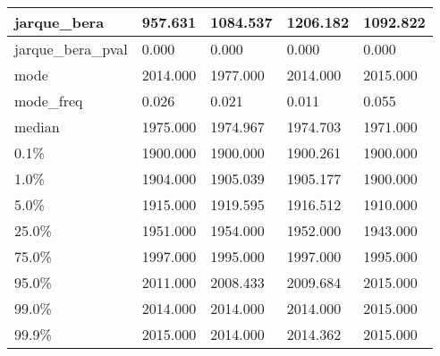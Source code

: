 \begin{table}[H]
\begin{tabular}{|l|m{10em}|m{10em}|m{10em}|m{10em}|}
\hline jarque\_bera & 957.631 & 1084.537 & 1206.182 & 1092.822 \\
\hline jarque\_bera\_pval & 0.000 & 0.000 & 0.000 & 0.000 \\
\hline mode & 2014.000 & 1977.000 & 2014.000 & 2015.000 \\
\hline mode\_freq & 0.026 & 0.021 & 0.011 & 0.055 \\
\hline median & 1975.000 & 1974.967 & 1974.703 & 1971.000 \\
\hline 0.1\% & 1900.000 & 1900.000 & 1900.261 & 1900.000 \\
\hline 1.0\% & 1904.000 & 1905.039 & 1905.177 & 1900.000 \\
\hline 5.0\% & 1915.000 & 1919.595 & 1916.512 & 1910.000 \\
\hline 25.0\% & 1951.000 & 1954.000 & 1952.000 & 1943.000 \\
\hline 75.0\% & 1997.000 & 1995.000 & 1997.000 & 1995.000 \\
\hline 95.0\% & 2011.000 & 2008.433 & 2009.684 & 2015.000 \\
\hline 99.0\% & 2014.000 & 2014.000 & 2014.000 & 2015.000 \\
\hline 99.9\% & 2015.000 & 2014.000 & 2014.362 & 2015.000 \\
\hline
\end{tabular}
\end{table}
